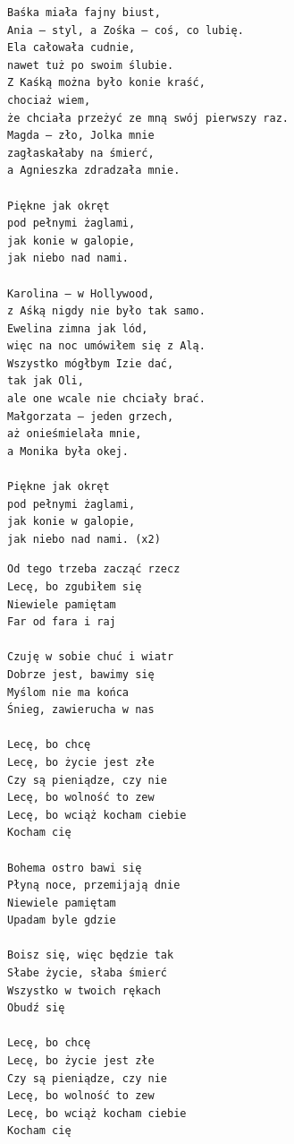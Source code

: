 \documentclass[12pt]{article}
\begin{document}
\begin{verbatim}
Baśka miała fajny biust,
Ania – styl, a Zośka – coś, co lubię.
Ela całowała cudnie,
nawet tuż po swoim ślubie.
Z Kaśką można było konie kraść,
chociaż wiem,
że chciała przeżyć ze mną swój pierwszy raz.
Magda – zło, Jolka mnie
zagłaskałaby na śmierć,
a Agnieszka zdradzała mnie.

Piękne jak okręt
pod pełnymi żaglami,
jak konie w galopie,
jak niebo nad nami.

Karolina – w Hollywood,
z Aśką nigdy nie było tak samo.
Ewelina zimna jak lód,
więc na noc umówiłem się z Alą.
Wszystko mógłbym Izie dać,
tak jak Oli,
ale one wcale nie chciały brać.
Małgorzata – jeden grzech,
aż onieśmielała mnie,
a Monika była okej.

Piękne jak okręt
pod pełnymi żaglami,
jak konie w galopie,
jak niebo nad nami. (x2)
\end{verbatim}
\clearpage

\begin{verbatim}
Od tego trzeba zacząć rzecz
Lecę, bo zgubiłem się
Niewiele pamiętam
Far od fara i raj

Czuję w sobie chuć i wiatr
Dobrze jest, bawimy się
Myślom nie ma końca
Śnieg, zawierucha w nas

Lecę, bo chcę
Lecę, bo życie jest złe
Czy są pieniądze, czy nie
Lecę, bo wolność to zew
Lecę, bo wciąż kocham ciebie
Kocham cię

Bohema ostro bawi się
Płyną noce, przemijają dnie
Niewiele pamiętam
Upadam byle gdzie

Boisz się, więc będzie tak
Słabe życie, słaba śmierć
Wszystko w twoich rękach
Obudź się

Lecę, bo chcę
Lecę, bo życie jest złe
Czy są pieniądze, czy nie
Lecę, bo wolność to zew
Lecę, bo wciąż kocham ciebie
Kocham cię
\end{verbatim}
\clearpage
\end{document}
